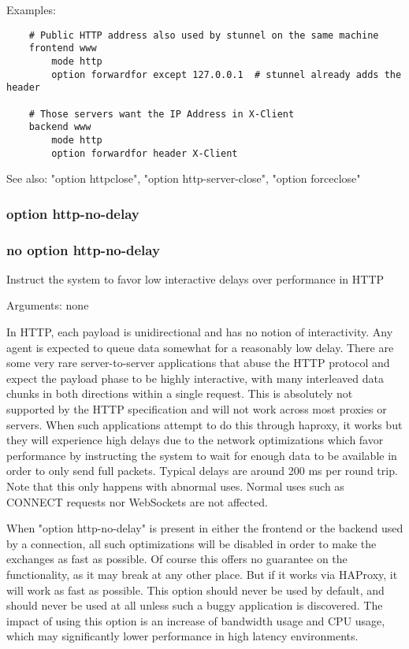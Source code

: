   Examples:
\begin{verbatim}
    # Public HTTP address also used by stunnel on the same machine
    frontend www
        mode http
        option forwardfor except 127.0.0.1  # stunnel already adds the header

    # Those servers want the IP Address in X-Client
    backend www
        mode http
        option forwardfor header X-Client
\end{verbatim}

  See also: "option httpclose", "option http-server-close",
             "option forceclose"

\subsubsection{option http-no-delay}
\subsubsection{no option http-no-delay}


  Instruct the system to favor low interactive delays over performance in HTTP


  Arguments: none

  In HTTP, each payload is unidirectional and has no notion of interactivity.
  Any agent is expected to queue data somewhat for a reasonably low delay.
  There are some very rare server-to-server applications that abuse the HTTP
  protocol and expect the payload phase to be highly interactive, with many
  interleaved data chunks in both directions within a single request. This is
  absolutely not supported by the HTTP specification and will not work across
  most proxies or servers. When such applications attempt to do this through
  haproxy, it works but they will experience high delays due to the network
  optimizations which favor performance by instructing the system to wait for
  enough data to be available in order to only send full packets. Typical
  delays are around 200 ms per round trip. Note that this only happens with
  abnormal uses. Normal uses such as CONNECT requests nor WebSockets are not
  affected.

  When "option http-no-delay" is present in either the frontend or the backend
  used by a connection, all such optimizations will be disabled in order to
  make the exchanges as fast as possible. Of course this offers no guarantee on
  the functionality, as it may break at any other place. But if it works via
  HAProxy, it will work as fast as possible. This option should never be used
  by default, and should never be used at all unless such a buggy application
  is discovered. The impact of using this option is an increase of bandwidth
  usage and CPU usage, which may significantly lower performance in high
  latency environments.

